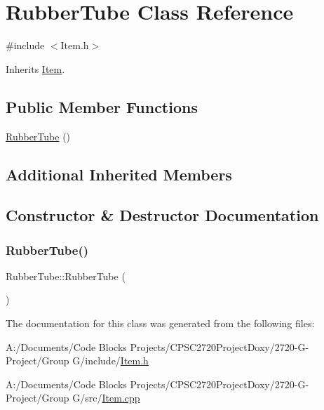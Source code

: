 \hypertarget{class_rubber_tube}{}\section{Rubber\+Tube Class Reference}
\label{class_rubber_tube}


{\ttfamily \#include $<$Item.\+h$>$}



Inherits \mbox{\hyperlink{class_item}{Item}}.

\subsection*{Public Member Functions}
\begin{DoxyCompactItemize}
\item 
\mbox{\hyperlink{class_rubber_tube_a45766cb5207c5bfeeb6b9c5c24cd61ca}{Rubber\+Tube}} ()
\end{DoxyCompactItemize}
\subsection*{Additional Inherited Members}


\subsection{Constructor \& Destructor Documentation}
\mbox{\label{class_rubber_tube_a45766cb5207c5bfeeb6b9c5c24cd61ca}} 
\subsubsection{\texorpdfstring{Rubber\+Tube()}{RubberTube()}}
{\footnotesize\ttfamily Rubber\+Tube\+::\+Rubber\+Tube (\begin{DoxyParamCaption}{ }\end{DoxyParamCaption})}



The documentation for this class was generated from the following files\+:\begin{DoxyCompactItemize}
\item 
A\+:/\+Documents/\+Code Blocks Projects/\+C\+P\+S\+C2720\+Project\+Doxy/2720-\/\+G-\/\+Project/\+Group G/include/\mbox{\hyperlink{_item_8h}{Item.\+h}}\item 
A\+:/\+Documents/\+Code Blocks Projects/\+C\+P\+S\+C2720\+Project\+Doxy/2720-\/\+G-\/\+Project/\+Group G/src/\mbox{\hyperlink{_item_8cpp}{Item.\+cpp}}\end{DoxyCompactItemize}
